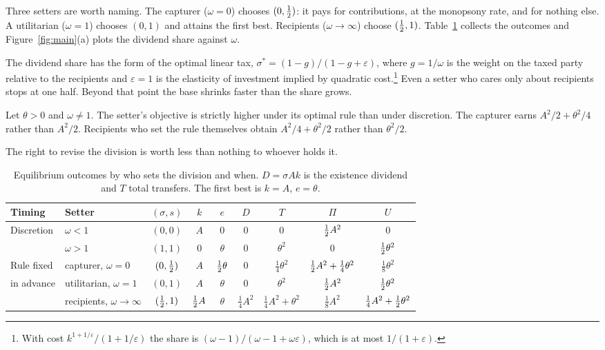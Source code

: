 Three setters are worth naming. The capturer ($\omega=0$) chooses $(0,\tfrac{1}{2})$: it pays for
contributions, at the monopsony rate, and for nothing else. A utilitarian ($\omega=1$)
chooses $(0,1)$ and attains the first best. Recipients ($\omega\to\infty$) choose
$(\tfrac{1}{2},1)$. Table~\ref{tab:regimes} collects the outcomes and Figure~\ref{fig:main}(a)
plots the dividend share against $\omega$.

The dividend share has the form of the optimal linear tax,
$\sigma^*=(1-g)/(1-g+\varepsilon)$, where $g=1/\omega$ is the weight on the taxed party
relative to the recipients and $\varepsilon=1$ is the elasticity of investment implied by
quadratic cost.\footnote{With cost $k^{1+1/\varepsilon}/(1+1/\varepsilon)$ the share is
$(\omega-1)/(\omega-1+\omega\varepsilon)$, which is at most $1/(1+\varepsilon)$.} Even a
setter who cares only about recipients stops at one half. Beyond that point the base
shrinks faster than the share grows.

\begin{corollary}\label{cor:bound}
Let $\theta>0$ and $\omega\neq 1$. The setter's objective is strictly higher under its
optimal rule than under discretion. The capturer earns $A^2/2+\theta^2/4$ rather than
$A^2/2$. Recipients who set the rule themselves obtain $A^2/4+\theta^2/2$ rather than
$\theta^2/2$.
\end{corollary}

The right to revise the division is worth less than nothing to whoever holds it.

\begin{table}[t]
\centering
\caption{Equilibrium outcomes by who sets the division and when. $D=\sigma Ak$ is the
existence dividend and $T$ total transfers. The first best is $k=A$, $e=\theta$.}
\label{tab:regimes}
\small
\setlength{\tabcolsep}{5.2pt}
\begin{tabular}{@{}llccccccc@{}}
\toprule
Timing & Setter & $(\sigma,s)$ & $k$ & $e$ & $D$ & $T$ & $\Pi$ & $U$\\
\midrule
Discretion & $\omega<1$ & $(0,0)$ & $A$ & $0$ & $0$ & $0$ & $\tfrac{1}{2} A^2$ & $0$\\[2pt]
           & $\omega>1$ & $(1,1)$ & $0$ & $\theta$ & $0$ & $\theta^2$ & $0$ & $\tfrac{1}{2}\theta^2$\\
\addlinespace[5pt]
Rule fixed & capturer, $\omega=0$ & $(0,\tfrac{1}{2})$ & $A$ & $\tfrac{1}{2}\theta$ & $0$
           & $\tfrac14\theta^2$ & $\tfrac{1}{2} A^2+\tfrac14\theta^2$ & $\tfrac18\theta^2$\\[2pt]
in advance & utilitarian, $\omega=1$ & $(0,1)$ & $A$ & $\theta$ & $0$ & $\theta^2$
           & $\tfrac{1}{2} A^2$ & $\tfrac{1}{2}\theta^2$\\[2pt]
           & recipients, $\omega\to\infty$ & $(\tfrac{1}{2},1)$ & $\tfrac{1}{2} A$ & $\theta$
           & $\tfrac14A^2$ & $\tfrac14A^2+\theta^2$ & $\tfrac18A^2$
           & $\tfrac14A^2+\tfrac{1}{2}\theta^2$\\
\bottomrule
\end{tabular}
\end{table}

